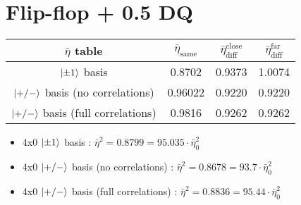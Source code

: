 \documentclass[a4paper]{article}
\begin{document}
\section{Flip-flop + 0.5 DQ}
\begin{tabular}{cccc}

\hline
$\bar{\eta}$ table & $\bar{\eta}_\textrm{same}$ & $\bar{\eta}_\textrm{diff}^\textrm{close}$ & $\bar{\eta}_\textrm{diff}^\textrm{far}$ \\
\hline
$\ket{\pm 1}$ basis & 0.8702 & 0.9373 & 1.0074 \\
$\ket{+/-}$ basis (no correlations) & 0.96022 & 0.9220 & 0.9220  \\
$\ket{+/-}$ basis (full correlations) & 0.9816 & 0.9262 & 0.9262 \\
\hline
\end{tabular}
\begin{itemize}
\item 4x0 $\ket{\pm 1}$ basis : $\bar{\eta}^2 = 0.8799 = 95.035 \cdot \bar{\eta}^2_0$
\item 4x0 $\ket{+/-}$ basis (no correlations) : $\bar{\eta}^2 = 0.8678 = 93.7 \cdot \bar{\eta}^2_0$
\item 4x0 $\ket{+/-}$ basis (full correlations) : $\bar{\eta}^2 = 0.8836 = 95.44 \cdot \bar{\eta}^2_0$
\end{itemize}
\end{document}
